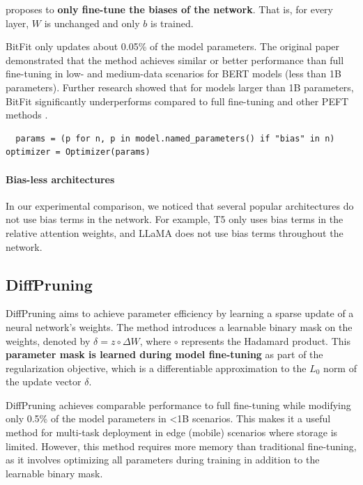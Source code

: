 \citet{bitfit} proposes to \textbf{only fine-tune the biases of the network}. That is, for every layer, $W$ is unchanged and only $b$ is trained.

BitFit only updates about 0.05\% of the model parameters. The original paper demonstrated that the method achieves similar or better performance than full fine-tuning in low- and medium-data scenarios for BERT models (less than 1B parameters). Further research showed that for models larger than 1B parameters, BitFit significantly underperforms compared to full fine-tuning and other PEFT methods \citep{t_zero,t_few,lora}.

\begin{lstlisting}
  params = (p for n, p in model.named_parameters() if "bias" in n) optimizer = Optimizer(params)
\end{lstlisting}

\paragraph{Bias-less architectures} In our experimental comparison, we noticed that several popular architectures do not use bias terms in the network. For example, T5 only uses bias terms in the relative attention weights, and LLaMA does not use bias terms throughout the network.

\subsection{DiffPruning}
\label{sec:diff_pruning}

DiffPruning \citep{diff_pruning} aims to achieve parameter efficiency by learning a sparse update of a neural network's weights. The method introduces a learnable binary mask on the weights, denoted by $\delta = z \circ \Delta W$, where $\circ$ represents the Hadamard product. This \textbf{parameter mask is learned during model fine-tuning} as part of the regularization objective, which is a differentiable approximation to the $L_0$ norm of the update vector $\delta$.

DiffPruning achieves comparable performance to full fine-tuning while modifying only 0.5\% of the model parameters in \textless1B scenarios. This makes it a useful method for multi-task deployment in edge (mobile) scenarios where storage is limited. However, this method requires more memory than traditional fine-tuning, as it involves optimizing all parameters during training in addition to the learnable binary mask.

